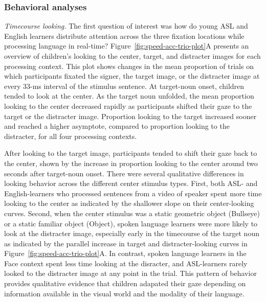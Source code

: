 \documentclass[english,floatsintext,man]{apa6}
\begin{document}
\hypertarget{behavioral-analyses}{%
\subsubsection{Behavioral analyses}\label{behavioral-analyses}}

\emph{Timecourse looking.} The first question of interest was how do
young ASL and English learners distribute attention across the three
fixation locations while processing language in real-time?
Figure~\ref{fig:speed-acc-trio-plot}A presents an overview of children's
looking to the center, target, and distracter images for each processing
context. This plot shows changes in the mean proportion of trials on
which participants fixated the signer, the target image, or the
distracter image at every 33-ms interval of the stimulus sentence. At
target-noun onset, children tended to look at the center. As the target
noun unfolded, the mean proportion looking to the center decreased
rapidly as participants shifted their gaze to the target or the
distracter image. Proportion looking to the target increased sooner and
reached a higher asymptote, compared to proportion looking to the
distracter, for all four processing contexts.

After looking to the target image, participants tended to shift their
gaze back to the center, shown by the increase in proportion looking to
the center around two seconds after target-noun onset. There were
several qualitative differences in looking behavior across the different
center stimulus types. First, both ASL- and English-learners who
processed sentences from a video of speaker spent more time looking to
the center as indicated by the shallower slope on their center-looking
curves. Second, when the center stimulus was a static geometric object
(Bullseye) or a static familiar object (Object), spoken language
learners were more likely to look at the distracter image, especially
early in the timecourse of the target noun as indicated by the parallel
increase in target and distracter-looking curves in
Figure~\ref{fig:speed-acc-trio-plot}A. In contrast, spoken language
learners in the Face context spent less time looking at the disracter,
and ASL-learners rarely looked to the distracter image at any point in
the trial. This pattern of behavior provides qualitative evidence that
children adapated their gaze depending on information available in the
visual world and the modality of their language.
\end{document}
